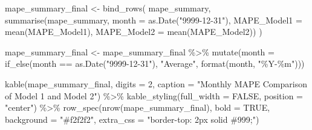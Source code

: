 \documentclass[
  11pt,
  a4paper,
]{article}
\newenvironment{Shaded}{\begin{snugshade}}{\end{snugshade}}
\newcommand{\AttributeTok}[1]{\textcolor[rgb]{0.40,0.45,0.13}{#1}}
\newcommand{\ConstantTok}[1]{\textcolor[rgb]{0.56,0.35,0.01}{#1}}
\newcommand{\DecValTok}[1]{\textcolor[rgb]{0.68,0.00,0.00}{#1}}
\newcommand{\FunctionTok}[1]{\textcolor[rgb]{0.28,0.35,0.67}{#1}}
\newcommand{\NormalTok}[1]{\textcolor[rgb]{0.00,0.23,0.31}{#1}}
\newcommand{\OtherTok}[1]{\textcolor[rgb]{0.00,0.23,0.31}{#1}}
\newcommand{\SpecialCharTok}[1]{\textcolor[rgb]{0.37,0.37,0.37}{#1}}
\newcommand{\StringTok}[1]{\textcolor[rgb]{0.13,0.47,0.30}{#1}}
\begin{document}
\begin{Shaded}
\begin{Highlighting}[]
\NormalTok{mape\_summary\_final }\OtherTok{\textless{}{-}} \FunctionTok{bind\_rows}\NormalTok{(}
\NormalTok{  mape\_summary,}
  \FunctionTok{summarise}\NormalTok{(mape\_summary,}
            \AttributeTok{month =} \FunctionTok{as.Date}\NormalTok{(}\StringTok{"9999{-}12{-}31"}\NormalTok{),}
            \AttributeTok{MAPE\_Model1 =} \FunctionTok{mean}\NormalTok{(MAPE\_Model1),}
            \AttributeTok{MAPE\_Model2 =} \FunctionTok{mean}\NormalTok{(MAPE\_Model2))}
\NormalTok{)}

\NormalTok{mape\_summary\_final }\OtherTok{\textless{}{-}}\NormalTok{ mape\_summary\_final }\SpecialCharTok{\%\textgreater{}\%}
  \FunctionTok{mutate}\NormalTok{(}\AttributeTok{month =} \FunctionTok{if\_else}\NormalTok{(month }\SpecialCharTok{==} \FunctionTok{as.Date}\NormalTok{(}\StringTok{"9999{-}12{-}31"}\NormalTok{), }\StringTok{"Average"}\NormalTok{, }\FunctionTok{format}\NormalTok{(month, }\StringTok{"\%Y{-}\%m"}\NormalTok{)))}

\FunctionTok{kable}\NormalTok{(mape\_summary\_final, }\AttributeTok{digits =} \DecValTok{2}\NormalTok{, }\AttributeTok{caption =} \StringTok{"Monthly MAPE Comparison of Model 1 and Model 2"}\NormalTok{) }\SpecialCharTok{\%\textgreater{}\%}
  \FunctionTok{kable\_styling}\NormalTok{(}\AttributeTok{full\_width =} \ConstantTok{FALSE}\NormalTok{, }\AttributeTok{position =} \StringTok{"center"}\NormalTok{) }\SpecialCharTok{\%\textgreater{}\%}
  \FunctionTok{row\_spec}\NormalTok{(}\FunctionTok{nrow}\NormalTok{(mape\_summary\_final), }\AttributeTok{bold =} \ConstantTok{TRUE}\NormalTok{, }\AttributeTok{background =} \StringTok{"\#f2f2f2"}\NormalTok{, }
           \AttributeTok{extra\_css =} \StringTok{"border{-}top: 2px solid \#999;"}\NormalTok{)}
\end{Highlighting}
\end{Shaded}
\end{document}
